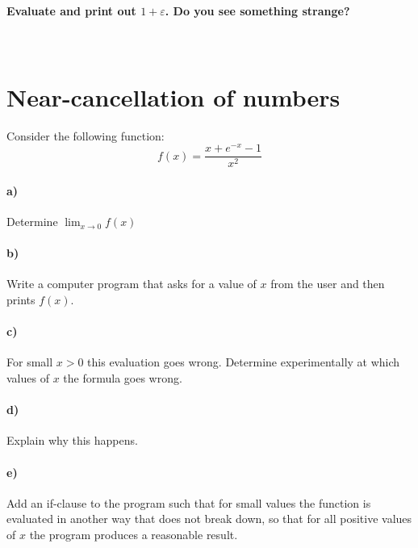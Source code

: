 \documentclass[11 pt]{article}
\begin{document}
        \paragraph{
            Evaluate and print out $1+\varepsilon$. Do you see something strange?
        } \ \\
    

    \newpage
    \section{Near-cancellation of numbers}
        Consider the following function:
        \begin{equation}
            f(x)=\frac{x+e^{-x}-1}{x^2}
        \end{equation}

        \paragraph{a)}
            Determine $\lim_{x\to0}f(x)$

        \paragraph{b)}
            Write a computer program that asks for a value of $x$ from the 
            user and then prints $f(x)$.

        \paragraph{c)}
            For small $x>0$ this evaluation goes wrong. Determine 
            experimentally at which values of $x$ the formula goes wrong.

        \paragraph{d)}
            Explain why this happens.

        \paragraph{e)}
            Add an if-clause to the program such that for small values the 
            function is evaluated in another way that does not break down, so 
            that for all positive values of $x$ the program produces a 
            reasonable result.
\end{document}
